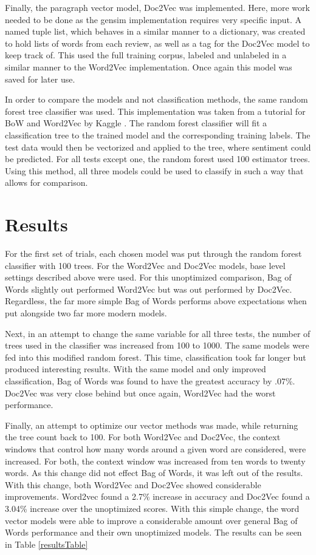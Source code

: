 \documentclass[journal]{IEEEtran}
\begin{document}
Finally, the paragraph vector model, Doc2Vec was implemented. Here, more work needed to be done as the gensim implementation requires very specific input. A named tuple list, which behaves in a similar manner to a dictionary, was created to hold lists of words from each review, as well as a tag for the Doc2Vec model to keep track of. This used the full training corpus, labeled and unlabeled in a similar manner to the Word2Vec implementation. Once again this model was saved for later use.

In order to compare the models and not classification methods, the same random forest tree classifier was used. This implementation was taken from a tutorial for BoW and Word2Vec by Kaggle \cite{kagglecompetition}. The random forest classifier will fit a classification tree to the trained model and the corresponding training labels. The test data would then be vectorized and applied to the tree, where sentiment could be predicted. For all tests except one, the random forest used 100 estimator trees. Using this method, all three models could be used to classify in such a way that allows for comparison.



\section{Results}
For the first set of trials, each chosen model was put through the random forest classifier with 100 trees. For the Word2Vec and Doc2Vec models, base level settings described above were used. For this unoptimized comparison, Bag of Words slightly out performed Word2Vec but was out performed by Doc2Vec. Regardless, the far more simple Bag of Words performs above expectations when put alongside two far more modern models. 

Next, in an attempt to change the same variable for all three tests, the number of trees used in the classifier was increased from 100 to 1000. The same models were fed into this modified random forest. This time, classification took far longer but produced interesting results. With the same model and only improved classification, Bag of Words was found to have the greatest accuracy by .07\%. Doc2Vec was very close behind but once again, Word2Vec had the worst performance. 

Finally, an attempt to optimize our vector methods was made, while returning the tree count back to 100. For both Word2Vec and Doc2Vec, the context windows that control how many words around a given word are considered, were increased. For both, the context window was increased from ten words to twenty words. As this change did not effect Bag of Words, it was left out of the results. With this change, both Word2Vec and Doc2Vec showed considerable improvements. Word2vec found a 2.7\% increase in accuracy and Doc2Vec found a 3.04\% increase over the unoptimized scores. With this simple change, the word vector models were able to improve a considerable amount over general Bag of Words performance and their own unoptimized models. The results can be seen in Table \ref{resultsTable} 
\end{document}
